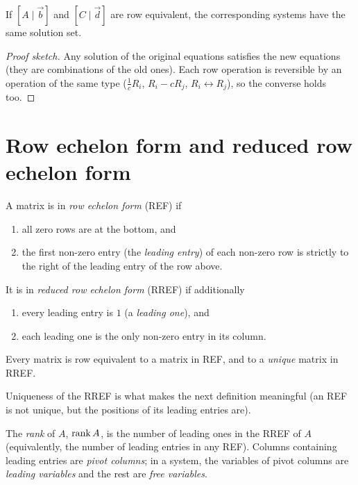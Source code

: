 \begin{theorem}
If $[A\mid\vec b]$ and $[C\mid\vec d]$ are row equivalent, the corresponding systems have the same
solution set.
\end{theorem}
\begin{proof}[Proof sketch]
Any solution of the original equations satisfies the new equations (they are combinations of
the old ones). Each row operation is reversible by an operation of the same type
($\frac1cR_i$, $R_i-cR_j$, $R_i\leftrightarrow R_j$), so the converse holds too.
\end{proof}

\section{Row echelon form and reduced row echelon form}

\begin{definition}
A matrix is in \emph{row echelon form} (REF) if
\begin{enumerate}
  \item all zero rows are at the bottom, and
  \item the first non-zero entry (the \emph{leading entry}) of each non-zero row is strictly to the
        right of the leading entry of the row above.
\end{enumerate}
It is in \emph{reduced row echelon form} (RREF) if additionally
\begin{enumerate}[resume]
  \item every leading entry is $1$ (a \emph{leading one}), and
  \item each leading one is the only non-zero entry in its column.
\end{enumerate}
\end{definition}

\begin{theorem}
Every matrix is row equivalent to a matrix in REF, and to a \emph{unique} matrix in RREF.
\end{theorem}

Uniqueness of the RREF is what makes the next definition meaningful (an REF is not unique, but
the positions of its leading entries are).

\begin{definition}
The \emph{rank} of $A$, $\operatorname{rank} A$, is the number of leading ones in the RREF of $A$ (equivalently,
the number of leading entries in any REF). Columns containing leading entries are \emph{pivot
columns}; in a system, the variables of pivot columns are \emph{leading variables} and the rest
are \emph{free variables}.
\end{definition}


